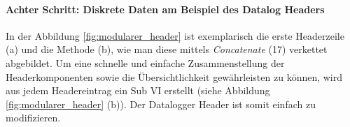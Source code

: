 \paragraph{Achter Schritt: Diskrete Daten am Beispiel des Datalog Headers}

In der Abbildung \ref{fig:modularer_header} ist exemplarisch die erste Headerzeile (a) und die Methode (b), wie man diese mittels \textit{Concatenate} (17) verkettet abgebildet. Um eine schnelle und einfache Zusammenstellung der Headerkomponenten sowie die Übersichtlichkeit gewährleisten zu können, wird aus jedem Headereintrag ein Sub VI erstellt (siehe Abbildung \ref{fig:modularer_header} (b)). Der Datalogger Header ist somit einfach zu modifizieren.


